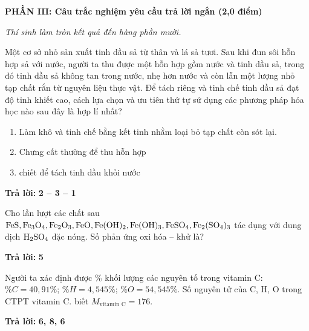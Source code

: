 \documentclass[11pt,a4paper]{article}
\begin{document}
\vspace{6pt}
{\large\bfseries\color{mainGreen} PHẦN III: Câu trắc nghiệm yêu cầu trả lời ngắn (2,0 điểm)}

\textit{Thí sinh làm tròn kết quả đến hàng phần mười.}
\vspace{4pt}
\begin{ex}
Một cơ sở nhỏ sản xuất tinh dầu sả từ thân và lá sả tươi. Sau khi đun sôi hỗn hợp sả với nước, người ta thu được một hỗn hợp gồm nước và tinh dầu sả, trong đó tinh dầu sả không tan trong nước, nhẹ hơn nước và còn lẫn một lượng nhỏ tạp chất rắn từ nguyên liệu thực vật. Để tách riêng và tinh chế tinh dầu sả đạt độ tinh khiết cao, cách lựa chọn và ưu tiên thứ tự sử dụng các phương pháp hóa học nào sau đây là hợp lí nhất?
\begin{enumerate}[label=\arabic*.,leftmargin=20pt,itemsep=0pt]
\item Làm khô và tinh chế bằng kết tinh nhằm loại bỏ tạp chất còn sót lại.
\item Chưng cất thường để thu hỗn hợp
\item chiết để tách tinh dầu khỏi nước
\end{enumerate}
\par\textbf{Trả lời:} \textbf{\color{hfRed}2 -- 3 -- 1}
\end{ex}
\begin{ex}
Cho lần lượt các chất sau $\ce{FeS}, \ce{Fe3O4}, \ce{Fe2O3}, \ce{FeO}, \ce{Fe(OH)2}, \ce{Fe(OH)3}, \ce{FeSO4}, \ce{Fe2(SO4)3}$ tác dụng với dung dịch $\ce{H2SO4}$ đặc nóng. Số phản ứng oxi hóa -- khử là?
\par\textbf{Trả lời:} \textbf{\color{hfRed}5}
\end{ex}
\begin{ex}
Người ta xác định được \% khối lượng các nguyên tố trong vitamin C: $\%C = 40{,}91\%$; $\%H = 4{,}545\%$; $\%O = 54{,}545\%$. Số nguyên tử của C, H, O trong CTPT vitamin C. biết $M_{\text{vitamin C}} = 176$.
\par\textbf{Trả lời:} \textbf{\color{hfRed}6, 8, 6}
\end{ex}
\end{document}

